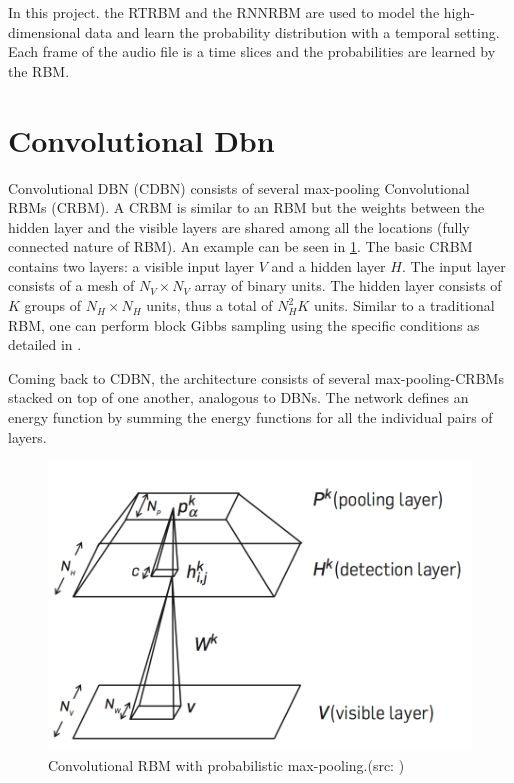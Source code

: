 \documentclass[letterpaper, 10 pt, conference]{ieeeconf}
\begin{document}
In this project. the RTRBM and the RNNRBM are used to model the high-dimensional data and learn the probability distribution with a temporal setting. Each frame of the audio file is a time slices and the probabilities are learned by the RBM.

\section{Convolutional Dbn} 
Convolutional DBN (CDBN) consists of several max-pooling Convolutional RBMs (CRBM). A CRBM is similar to an RBM but the weights between the hidden layer and the visible layers are shared among all the locations (fully connected nature of RBM). An example can be seen in \ref{fig:crbm}. The basic CRBM contains two layers: a visible input layer $V$ and a hidden layer $H$. The input layer consists of a mesh of $N_V \times N_V$ array of binary units. The hidden layer consists of $K$ groups of $N_H \times N_H$ units, thus a total of $N_H^2 K$ units. Similar to a traditional RBM, one can perform block Gibbs sampling using the specific conditions as detailed in \cite{c12}.

Coming back to CDBN, the architecture consists of several max-pooling-CRBMs stacked on top of one another, analogous to DBNs. The network defines an energy function by summing the energy functions for all the individual pairs of layers.
\begin{figure}[thpb]
      \centering
      \includegraphics[scale=0.55]{crbm.png}
      \caption{Convolutional RBM with probabilistic max-pooling.(src: \cite{c12})}
      \label{fig:crbm}
\end{figure}
\end{document}
